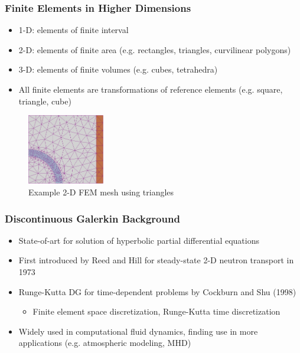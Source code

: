 \documentclass[serif,12pt]{beamer}
\begin{document}
\begin{frame}
\frametitle{Finite Elements in Higher Dimensions}
	\begin{itemize}
		\item 1-D: elements of finite interval
		\item 2-D: elements of finite area (e.g. rectangles, triangles, curvilinear polygons)
		\item 3-D: elements of finite volumes (e.g. cubes, tetrahedra)
		\item All finite elements are transformations of reference elements (e.g. square, triangle, cube)
	\end{itemize}
	\begin{figure}
    	\includegraphics[width=0.3\textwidth]{figures/2d_mesh.png}
    	\caption{Example 2-D FEM mesh using triangles}
    	\let\thefootnote\relax{}
	\end{figure}
\end{frame}

\begin{frame}
\frametitle{Discontinuous Galerkin Background}
	\begin{itemize}
		\item State-of-art for solution of hyperbolic partial differential equations
		\item First introduced by Reed and Hill for steady-state 2-D neutron transport in 1973
		\item Runge-Kutta DG for time-dependent problems by Cockburn and Shu (1998)
		\begin{itemize}
			\item Finite element space discretization, Runge-Kutta time discretization
		\end{itemize}
		\item Widely used in computational fluid dynamics, finding use in more applications (e.g. atmospheric modeling, MHD)
	\end{itemize}
\end{frame}
\end{document}
